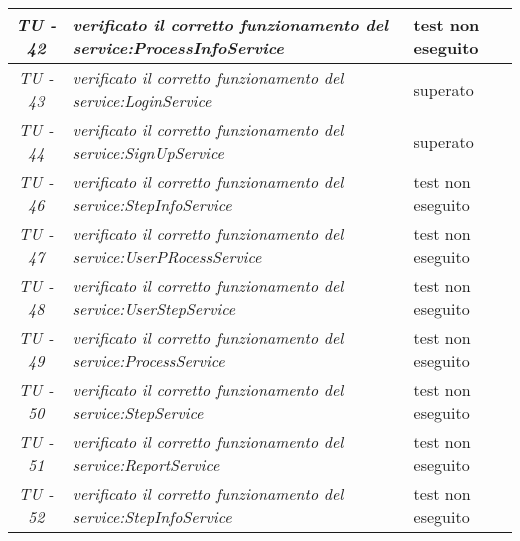 \begin{small}\centering
\begin{tabular}{|c|p{8.0cm}|p{2.0cm}|}
\textit{TU - 42} &
\textit{verificato il corretto funzionamento del service:ProcessInfoService} & test non eseguito \\
\hline

\textit{TU - 43} &
\textit{verificato il corretto funzionamento del service:LoginService} & superato \\
\hline

\textit{TU - 44} &
\textit{verificato il corretto funzionamento del service:SignUpService} & superato \\
\hline

\textit{TU - 46} &
\textit{verificato il corretto funzionamento del service:StepInfoService} & test non eseguito \\
\hline

\textit{TU - 47} &
\textit{verificato il corretto funzionamento del service:UserPRocessService} & test non eseguito \\
\hline

\textit{TU - 48} &
\textit{verificato il corretto funzionamento del service:UserStepService} & test non eseguito \\
\hline

\textit{TU - 49} &
\textit{verificato il corretto funzionamento del service:ProcessService} & test non eseguito \\
\hline

\textit{TU - 50} &
\textit{verificato il corretto funzionamento del service:StepService} & test non eseguito \\
\hline

\textit{TU - 51} &
\textit{verificato il corretto funzionamento del service:ReportService} & test non eseguito \\
\hline

\textit{TU - 52} &
\textit{verificato il corretto funzionamento del service:StepInfoService} & test non eseguito \\
\hline
\end{tabular}\\
\end{small}

